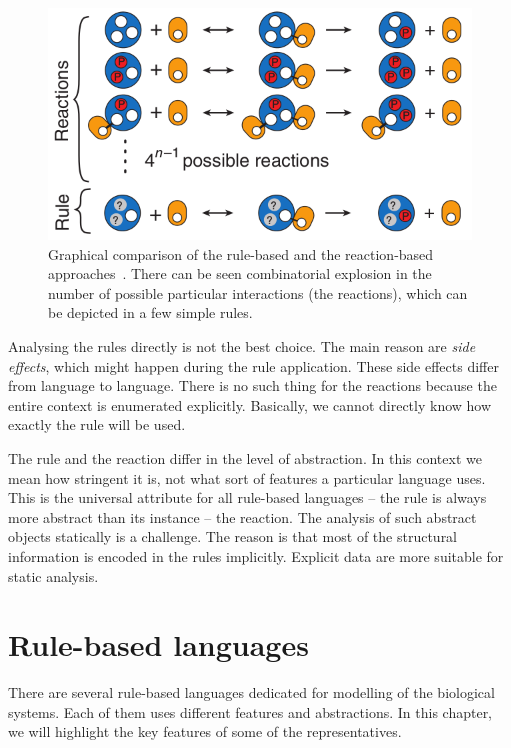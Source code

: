 \documentclass[12pt, twoside]{fithesis2} %
\begin{document}
\begin{figure}[!h]
\begin{center}
\includegraphics[scale=0.5]{pics/reaction_vs_rule}
\end{center}
\caption{Graphical comparison of the rule-based and the reaction-based approaches~\cite{sneddon2011efficient}. There can be seen combinatorial explosion in the number of possible particular interactions (the reactions), which can be depicted in a few simple rules.}\label{reaction_vs_rule}
\end{figure}

Analysing the rules directly is not the best choice. The main reason are \emph{side effects}, which might happen during the rule application. These side effects differ from language to language. There is no such thing for the reactions because the entire context is enumerated explicitly. Basically, we cannot directly know how exactly the rule will be used.

The rule and the reaction differ in the level of abstraction. In this context we mean how stringent it is, not what sort of features a particular language uses. This is the universal attribute for all rule-based languages -- the rule is always more abstract than its instance -- the reaction. The analysis of such abstract objects statically is a challenge. The reason is that most of the structural information is encoded in the rules implicitly. Explicit data are more suitable for static analysis.

\section{Rule-based languages}
\label{rule_based_languages}

There are several rule-based languages dedicated for modelling of the biological systems. Each of them uses different features and abstractions. In this chapter, we will highlight the key features of some of the representatives.
\end{document}
